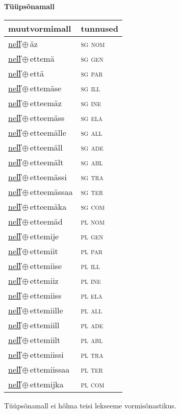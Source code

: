 

\vspace{3.5em}
\noindent \begin{minipage}{\textwidth}
\noindent \textbf{Tüüpsõnamall \,}\\

\begin{sideways}
\begin{tabular}{l l}
muutvormimall & tunnused \\
\hline
\underline{nel̕l̕}\,$\oplus$\,äz & \textsc{ sg nom } \\
\underline{nel̕l̕}\,$\oplus$\,ettemä & \textsc{ sg gen } \\
\underline{nel̕l̕}\,$\oplus$\,että & \textsc{ sg par } \\
\underline{nel̕l̕}\,$\oplus$\,ettemäse & \textsc{ sg ill } \\
\underline{nel̕l̕}\,$\oplus$\,etteemäz & \textsc{ sg ine } \\
\underline{nel̕l̕}\,$\oplus$\,etteemäss & \textsc{ sg ela } \\
\underline{nel̕l̕}\,$\oplus$\,etteemälle & \textsc{ sg all } \\
\underline{nel̕l̕}\,$\oplus$\,etteemäll & \textsc{ sg ade } \\
\underline{nel̕l̕}\,$\oplus$\,etteemält & \textsc{ sg abl } \\
\underline{nel̕l̕}\,$\oplus$\,etteemässi & \textsc{ sg tra } \\
\underline{nel̕l̕}\,$\oplus$\,etteemässaa & \textsc{ sg ter } \\
\underline{nel̕l̕}\,$\oplus$\,etteemäka & \textsc{ sg com } \\
\underline{nel̕l̕}\,$\oplus$\,etteemäd & \textsc{ pl nom } \\
\underline{nel̕l̕}\,$\oplus$\,ettemije & \textsc{ pl gen } \\
\underline{nel̕l̕}\,$\oplus$\,ettemiit & \textsc{ pl par } \\
\underline{nel̕l̕}\,$\oplus$\,ettemiise & \textsc{ pl ill } \\
\underline{nel̕l̕}\,$\oplus$\,ettemiiz & \textsc{ pl ine } \\
\underline{nel̕l̕}\,$\oplus$\,ettemiiss & \textsc{ pl ela } \\
\underline{nel̕l̕}\,$\oplus$\,ettemiille & \textsc{ pl all } \\
\underline{nel̕l̕}\,$\oplus$\,ettemiill & \textsc{ pl ade } \\
\underline{nel̕l̕}\,$\oplus$\,ettemiilt & \textsc{ pl abl } \\
\underline{nel̕l̕}\,$\oplus$\,ettemiissi & \textsc{ pl tra } \\
\underline{nel̕l̕}\,$\oplus$\,ettemiissaa & \textsc{ pl ter } \\
\underline{nel̕l̕}\,$\oplus$\,ettemijka & \textsc{ pl com } \\
\end{tabular}
\end{sideways}
\label{tab:tüüpsõnamall-nel̕l̕äz}

\end{minipage}

 
\vspace{1em}
\noindent Tüüpsõnamall  ei hõlma teisi lekseeme vormi\-sõnastikus.
